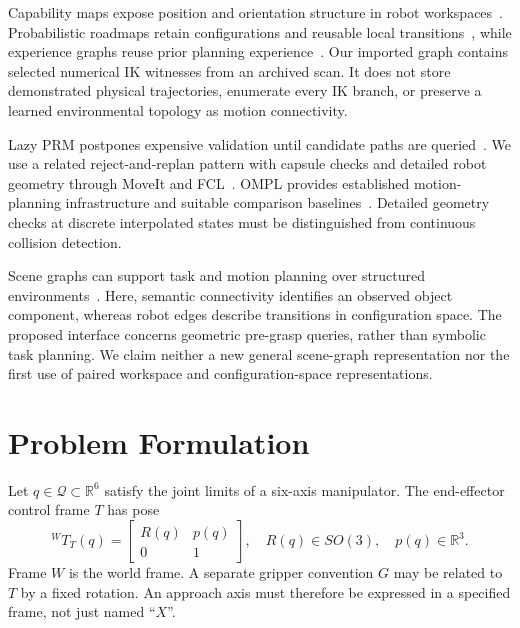 \documentclass[letterpaper,10pt,conference]{ieeeconf}
\newcommand{\R}{\mathbb{R}}
\begin{document}
Capability maps expose position and orientation structure in robot workspaces~\cite{zacharias2007capability}. Probabilistic roadmaps retain configurations and reusable local transitions~\cite{kavraki1996prm}, while experience graphs reuse prior planning experience~\cite{phillips2012egraphs}. Our imported graph contains selected numerical IK witnesses from an archived scan. It does not store demonstrated physical trajectories, enumerate every IK branch, or preserve a learned environmental topology as motion connectivity.

Lazy PRM postpones expensive validation until candidate paths are queried~\cite{bohlin2000lazyprm}. We use a related reject-and-replan pattern with capsule checks and detailed robot geometry through MoveIt and FCL~\cite{coleman2014moveit,pan2012fcl}. OMPL provides established motion-planning infrastructure and suitable comparison baselines~\cite{sucan2012ompl}. Detailed geometry checks at discrete interpolated states must be distinguished from continuous collision detection.

Scene graphs can support task and motion planning over structured environments~\cite{ray2024scenegraph}. Here, semantic connectivity identifies an observed object component, whereas robot edges describe transitions in configuration space. The proposed interface concerns geometric pre-grasp queries, rather than symbolic task planning. We claim neither a new general scene-graph representation nor the first use of paired workspace and configuration-space representations.

\section{Problem Formulation}
Let $q\in\mathcal Q\subset\R^6$ satisfy the joint limits of a six-axis manipulator. The end-effector control frame $T$ has pose
\begin{equation}
 {}^WT_T(q)=\begin{bmatrix}R(q)&p(q)\\0&1\end{bmatrix},
 \quad R(q)\in SO(3),\quad p(q)\in\R^3.
\end{equation}
Frame $W$ is the world frame. A separate gripper convention $G$ may be related to $T$ by a fixed rotation. An approach axis must therefore be expressed in a specified frame, not just named ``$X$''.
\end{document}
